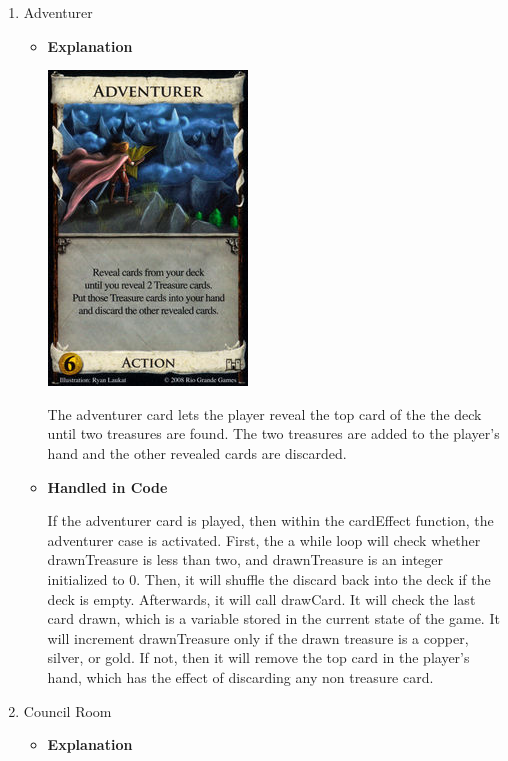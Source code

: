 \documentclass[11pt,letterpaper]{article}
\begin{document}
\begin{enumerate}
\begin{itemize}
    \end{itemize}

  \item Adventurer
    \begin{itemize}
      \item \textbf{Explanation}

        \includegraphics{dominion_adventurer.jpg}
        
        The adventurer card lets the player 
        reveal the top card of the the deck until
        two treasures are found. The two treasures
        are added to the player's hand and the
        other revealed cards are discarded. 
        
      \item \textbf{Handled in Code}
      
        If the adventurer card is played, then within
        the cardEffect function, the adventurer case
        is activated. First, the a while loop will
        check whether drawnTreasure is less than two,
        and drawnTreasure is an integer initialized to
        0. Then, it will shuffle the discard back into
        the deck if the deck is empty. Afterwards, it
        will call drawCard. It will check the last
        card drawn, which is a variable stored in
        the current state of the game. It will 
        increment drawnTreasure only if the drawn
        treasure is a copper, silver, or gold. If not, 
        then it will remove the top card in the player's 
        hand, which has the effect of discarding any non
        treasure card. 

    \end{itemize}

  \item Council Room
    \begin{itemize}
      \item \textbf{Explanation}


\end{itemize}
\end{enumerate}
\end{document}
